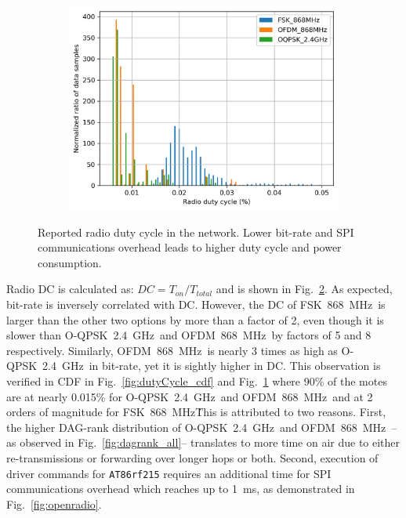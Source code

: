 \documentclass[sensors,article,submit,moreauthors,pdftex]{Definitions/mdpi}
\newcommand{\fsk}          {FSK~868~MHz}
\newcommand{\oqpsk}        {O-QPSK~2.4~GHz}
\newcommand{\ofdm}         {OFDM~868~MHz}
\begin{document}
\begin{figure}
\begin{subfigure}{0.49\columnwidth}
		\centering
    	\includegraphics[width=1.00\columnwidth]{dutyCycle_pdf}
    	\label{fig:dutyCycle_pdf}
	\end{subfigure}
	\caption{
	    Reported radio duty cycle in the network.
	    Lower bit-rate and SPI communications overhead leads to higher duty cycle and power consumption.
	}
	\label{fig:dutyCycle_all}
\end{figure}

Radio DC is calculated as: $DC=T_{on}/T_{total}$ and is shown in Fig.~\ref{fig:dutyCycle_all}.
As expected, bit-rate is inversely correlated with DC. 
However, the DC of \fsk\ is larger than the other two options by more than a factor of 2, even though it is slower than \oqpsk\ and \ofdm\ by factors of 5 and 8 respectively. 
Similarly, \ofdm\ is nearly 3 times as high as  \oqpsk\ in bit-rate, yet it is sightly higher in DC.
This observation is verified in CDF in Fig.~\ref{fig:dutyCycle_cdf} and Fig.~\ref{fig:dutyCycle_pdf} where 90\% of the motes are at nearly 0.015\% for \oqpsk\ and \ofdm\ and at 2 orders of magnitude for \fsk\. 
This is attributed to two reasons.
First, the higher DAG-rank distribution of \oqpsk\ and \ofdm\ -- as observed in Fig.~\ref{fig:dagrank_all}-- translates to more time on air due to either re-transmissions or forwarding over longer hops or both.
Second, execution of driver commands for \texttt{AT86rf215} requires an additional time for SPI communications overhead which reaches up to 1~ms, as demonstrated in Fig.~\ref{fig:openradio}.
\end{document}
